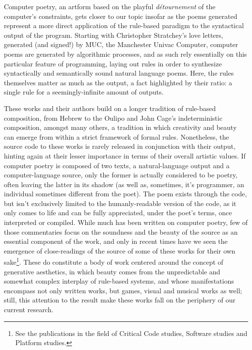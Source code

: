 \documentclass{article}
\begin{document}
Computer poetry, an artform based on the playful \emph{détournement} of the computer's constraints, gets closer to our topic insofar as the poems generated represent a more direct application of the rule-based paradigm to the syntactical output of the program. Starting with Christopher Stratchey's love letters, generated (and signed!) by MUC, the Manchester Univac Computer, computer poems are generated by algorithmic processes, and as such rely essentially on this particular feature of programming, laying out rules in order to synthesize syntactically and semantically sound natural language poems. Here, the rules themselves matter as much as the output, a fact highlighted by their ratio: a single rule for a seemingly-infinite amount of outputs.

These works and their authors build on a longer tradition of rule-based composition, from Hebrew to the Oulipo and John Cage's indeterministic composition, amongst many others\cite{cramer_words_2003}, a tradition in which creativity and beauty can emerge from within a strict framework of formal rules. Nonetheless, the source code to these works is rarely released in conjunction with their output, hinting again at their lesser importance in terms of their overall artistic values. If computer poetry is composed of two texts, a natural-language output and a computer-language source, only the former is actually considered to be poetry, often leaving the latter in its shadow (as well as, sometimes, it's programmer, an individual sometimes different from the poet). The poem exists through the code, but isn't exclusively limited to the humanly-readable version of the code, as it only comes to life and can be fully appreciated, under the poet's terms, once interpreted or compiled. While much has been written on computer poetry, few of those commentaries focus on the soundness and the beauty of the source as an essential component of the work, and only in recent times have we seen the emergence of close-readings of the source of some of these works for their own sake\footnote{See the publications in the field of Critical Code studies, Software studies and Platform studies.}. These do constitute a body of work centered around the concept of generative aesthetics\cite{goriunova_read_2005}, in which beauty comes from the unpredictable and somewhat complex interplay of rule-based systems, and whose manifestations encompass not only written works, but games, visual and musical works as well; still, this attention to the result make these works fall on the periphery of our current research.
\end{document}
